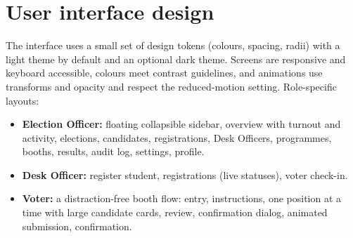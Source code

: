 \section{User interface design}

The interface uses a small set of design tokens (colours, spacing, radii) with a light theme by default and an optional dark theme. Screens are responsive and keyboard accessible, colours meet contrast guidelines, and animations use transforms and opacity and respect the reduced-motion setting. Role-specific layouts:

\begin{itemize}
  \item \textbf{Election Officer:} floating collapsible sidebar, overview with turnout and activity, elections, candidates, registrations, Desk Officers, programmes, booths, results, audit log, settings, profile.
  \item \textbf{Desk Officer:} register student, registrations (live statuses), voter check-in.
  \item \textbf{Voter:} a distraction-free booth flow: entry, instructions, one position at a time with large candidate cards, review, confirmation dialog, animated submission, confirmation.
\end{itemize}
